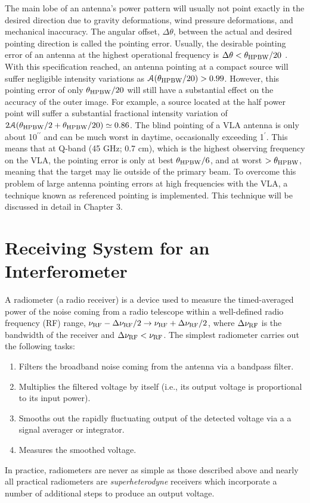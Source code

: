 The main lobe of an antenna's power pattern will usually not point exactly in the desired direction due to gravity deformations, wind pressure deformations, and mechanical inaccuracy. The angular offset, $\Delta \theta$, between the actual and desired pointing direction is called the pointing error. Usually, the desirable pointing error of  an antenna at the highest operational frequency is $\Delta \theta < \theta _{\rm{HPBW}}/20$ \citep{taylor_1999}. With this specification reached, an antenna pointing at a compact source will suffer negligible intensity variations as $\mathcal{A}(\theta _{\rm{HPBW}}/20) > 0.99$. However, this pointing error of only $\theta _{\rm{HPBW}}/20$ will still have a substantial effect on the accuracy of the outer image. For example, a source located at the half power point will suffer a substantial fractional intensity variation of $2\mathcal{A}(\theta _{\rm{HPBW}}/2+\theta _{\rm{HPBW}}/20) \simeq 0.86$. The blind pointing of a VLA antenna is only about 10$^{\prime\prime}$ and can be much worst in daytime, occasionally exceeding 1$^{\prime}$. This means that at Q-band (45 GHz; 0.7 cm), which is the highest observing frequency on the VLA, the pointing error is only at best $\theta _{\rm{HPBW}}/6$, and at worst $>\theta _{\rm{HPBW}}$, meaning that the target may lie outside of the primary beam. To overcome this problem of large antenna pointing errors at high frequencies with the VLA, a technique known as referenced pointing is implemented. This technique will be discussed in detail in Chapter 3. 

\section{Receiving System for an Interferometer}\label{sec:2.2}

A radiometer (a radio receiver) is a device  used to measure the  timed-averaged power of the noise coming from a radio telescope within a  well-defined radio frequency (RF) range, $\nu _{\rm{RF}}-\Delta \nu _{\rm{RF}}/2 \rightarrow \nu _{\rm{RF}}+\Delta \nu _{\rm{RF}}/2$, where $\Delta \nu _{\rm{RF}}$ is the bandwidth of the receiver and $\Delta \nu _{\rm{RF}}< \nu _{\rm{RF}}$. 
The simplest radiometer carries out the following tasks:
\begin{enumerate}
\item Filters the broadband noise coming from the antenna via a bandpass filter.
\item Multiplies the filtered voltage by itself (i.e., its output voltage is proportional to its input power).
\item Smooths out the rapidly fluctuating output of the detected voltage via a a signal averager or integrator.
\item Measures the smoothed voltage.
\end{enumerate}
In practice, radiometers are never as simple as those described above and nearly all practical radiometers are \textit{superheterodyne} receivers which incorporate a number of additional steps to produce an output voltage.


